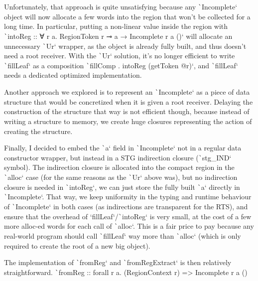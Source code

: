 \documentclass[english]{jflart}
\begin{document}
Unfortunately, that approach is quite unsatisfying because any \texttt`Incomplete` object will now allocate a few words into the region that won't be collected for a long time. In particular, putting a non-linear value inside the region with \texttt`intoReg :: ∀ r a. RegionToken r ⊸ a → Incomplete r a ()` will allocate an unnecessary \texttt`Ur` wrapper, as the object is already fully built, and thus doesn't need a root receiver. With the \texttt`Ur` solution, it's no longer efficient to write \texttt`fillLeaf` as a composition \texttt`fillComp . intoReg (getToken @r)`, and \texttt`fillLeaf` needs a dedicated optimized implementation.

Another approach we explored is to represent an \texttt`Incomplete` as a piece of data structure that would be concretized when it is given a root receiver. Delaying the construction of the structure that way is not efficient though, because instead of writing a structure to memory, we create huge closures representing the action of creating the structure.

Finally, I decided to embed the \texttt`a` field in \texttt`Incomplete` not in a regular data constructor wrapper, but instead in a STG indirection closure (\texttt`stg_IND` symbol). The indirection closure is allocated into the compact region in the \texttt`alloc` case (for the same reasons as the \texttt`Ur` above was), but no indirection closure is needed in \texttt`intoReg`, we can just store the fully built \texttt`a` directly in \texttt`Incomplete`. That way, we keep uniformity in the typing and runtime behaviour of \texttt`Incomplete` in both cases (as indirections are transparent for the RTS), and ensure that the overhead of `fillLeaf`/\texttt`intoReg` is very small, at the cost of a few more alloc-ed words for each call of \texttt`alloc`. This is a fair price to pay because any real-world program should call \texttt`fillLeaf` way more than \texttt`alloc` (which is only required to create the root of a new big object).

The implementation of \texttt`fromReg` and \texttt`fromRegExtract` is then relatively straightforward. \texttt`fromReg :: forall r a. (RegionContext r) => Incomplete r a () %
\end{document}
